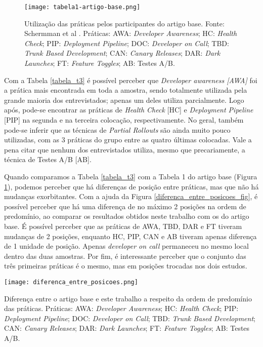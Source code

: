 \begin{figure}[ht]
\begin{center}
\texttt{[image: tabela1-artigo-base.png]}
\end{center}
\caption[Tabela 1 do artigo base]{
    Utilização das práticas pelos participantes do artigo base.
    Fonte: Schermman et al \cite{empiricalStudy2016}. Práticas: AWA: \emph{Developer Awareness}; HC: \emph{Health Check}; PIP: \emph{Deployment Pipeline}; DOC: \emph{Developer on Call}; TBD: \emph{Trunk Based Development}; CAN: \emph{Canary Releases}; DAR: \emph{Dark Launches}; FT: \emph{Feature Toggles}; AB: Testes A/B.
}\label{tabela_1_artigo_base}
\end{figure}

Com a Tabela \ref{tabela_t3} é possível perceber que \emph{Developer awareness [AWA]} foi a prática mais encontrada em toda a amostra, sendo totalmente utilizada pela grande maioria dos entrevistados; apenas um deles utiliza parcialmente. Logo após, pode-se encontrar as práticas de \emph{Health Check} [HC] e \emph{Deployment Pipeline} [PIP] na segunda e na terceira colocação, respectivamente. No geral, também pode-se inferir que as técnicas de \emph{Partial Rollouts} são ainda muito pouco utilizadas, com as 3 práticas do grupo entre as quatro últimas colocadas. Vale a pena citar que nenhum dos entrevistados utiliza, mesmo que precariamente, a técnica de Testes A/B [AB].

Quando comparamos a Tabela \ref{tabela_t3} com a Tabela 1 do artigo base (Figura \ref{tabela_1_artigo_base}), podemos perceber que há diferenças de posição entre práticas, mas que não há mudanças exorbitantes. Com a ajuda da Figura \ref{diferenca_entre_posicoes_fig}, é possível perceber que há uma diferença de no máximo 2 posições na ordem de predomínio, ao comparar os resultados obtidos neste trabalho com os do artigo base. É possível perceber que as práticas de AWA, TBD, DAR e FT tiveram mudanças de 2 posições, enquanto HC, PIP, CAN e AB tiveram apenas diferença de 1 unidade de posição. Apenas \emph{developer on call} permaneceu no mesmo local dentro das duas amostras. Por fim, é interessante perceber que o conjunto das três primeiras práticas é o mesmo, mas em posições trocadas nos dois estudos.

\begin{table}[ht]
\begin{center}
\texttt{[image: diferenca\_entre\_posicoes.png]}
\end{center}
\caption[Diferença entre a ordem de predomínio das práticas]{
    Diferença entre o artigo base e este trabalho a respeito da ordem de predomínio das práticas. Práticas: AWA: \emph{Developer Awareness}; HC: \emph{Health Check}; PIP: \emph{Deployment Pipeline}; DOC: \emph{Developer on Call}; TBD: \emph{Trunk Based Development}; CAN: \emph{Canary Releases}; DAR: \emph{Dark Launches}; FT: \emph{Feature Toggles}; AB: Testes A/B.
}\label{diferenca_entre_posicoes_fig}
\end{table}

